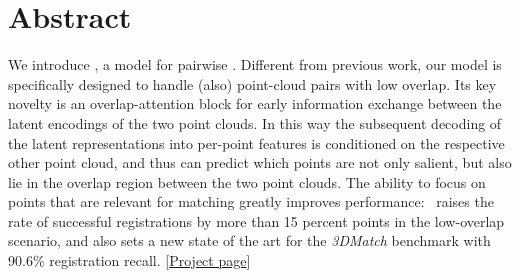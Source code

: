 \section*{Abstract}
We introduce \acro, a model for pairwise \acroexplain. Different from previous work, our model is specifically designed to handle (also) point-cloud pairs with low overlap.  Its key novelty is an  overlap-attention block for early information exchange between the latent encodings of the two point clouds. In this way the subsequent decoding of the latent representations into per-point features is conditioned on the respective other point cloud, and thus can predict which points are not only salient, but also lie in the overlap region between the two point clouds. The ability to focus on points that are relevant for matching greatly improves performance: \acro\ raises the rate of successful registrations by more than 15 percent points in the low-overlap scenario, and also sets a new state of the art for the \emph{3DMatch} benchmark with 90.6\% registration recall. [\href{https://shengyuh.github.io/predator/index.html}{Project page}] 